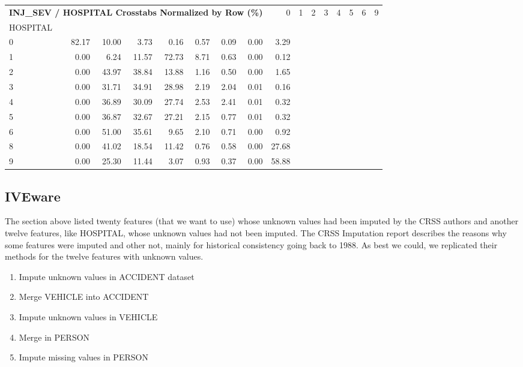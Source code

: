 \vskip 12pt

\hfil\begin{tabular}{lrrrrrrrr}
\multicolumn{8}{l}{\bf INJ\_SEV / HOSPITAL Crosstabs Normalized by Row (\%)}\cr\hline
INJ\_SEV &      0 &      1 &      2 &      3 &     4 &     5 &     6 &      9 \\
HOSPITAL &        &        &        &        &       &       &       &        \\
\hline
0        &  82.17 &  10.00 &   3.73 &   0.16 &  0.57 &  0.09 &  0.00 &   3.29 \\
1        &   0.00 &   6.24 &  11.57 &  72.73 &  8.71 &  0.63 &  0.00 &   0.12 \\
2        &   0.00 &  43.97 &  38.84 &  13.88 &  1.16 &  0.50 &  0.00 &   1.65 \\
3        &   0.00 &  31.71 &  34.91 &  28.98 &  2.19 &  2.04 &  0.01 &   0.16 \\
4        &   0.00 &  36.89 &  30.09 &  27.74 &  2.53 &  2.41 &  0.01 &   0.32 \\
5        &   0.00 &  36.87 &  32.67 &  27.21 &  2.15 &  0.77 &  0.01 &   0.32 \\
6        &   0.00 &  51.00 &  35.61 &   9.65 &  2.10 &  0.71 &  0.00 &   0.92 \\
8        &   0.00 &  41.02 &  18.54 &  11.42 &  0.76 &  0.58 &  0.00 &  27.68 \\
9        &   0.00 &  25.30 &  11.44 &   3.07 &  0.93 &  0.37 &  0.00 &  58.88 \\
\end{tabular}

\subsection{IVEware}

The  section above listed twenty features (that we want to use) whose unknown values had been imputed by the CRSS authors and another twelve features, like HOSPITAL, whose unknown values had not been imputed.  The CRSS Imputation report describes the reasons why some features were imputed and other not, mainly for historical consistency going back to 1988.  \cite{CRSS_Imputation} As best we could, we replicated their methods for the twelve features with unknown values.  

\begin{enumerate}
	\item Impute unknown values in ACCIDENT dataset
	\item Merge VEHICLE into ACCIDENT
	\item Impute unknown values in VEHICLE
	\item Merge in PERSON
	\item Impute missing values in PERSON
\end{enumerate}

